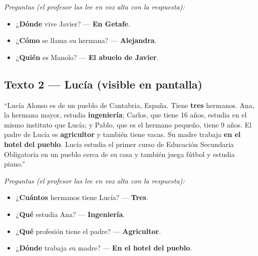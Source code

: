 \documentclass[a4paper,10pt]{article}
\begin{document}
\vspace{0.2cm}

\textit{Preguntas (el profesor las lee en voz alta con la respuesta):}

\begin{itemize}[leftmargin=1.5cm, itemsep=2pt]
\item[\textcolor{verde}{$\bullet$}] ¿\textcolor{verde}{\textbf{Dónde}} vive Javier? --- \textcolor{verde}{\textbf{En Getafe}}.
\item[\textcolor{colornaranja}{$\bullet$}] ¿\textcolor{colornaranja}{\textbf{Cómo}} se llama su hermana? --- \textcolor{colornaranja}{\textbf{Alejandra}}.
\item[\textcolor{rojo}{$\bullet$}] ¿\textcolor{rojo}{\textbf{Quién}} es Manolo? --- \textcolor{rojo}{\textbf{El abuelo de Javier}}.
\end{itemize}

\vspace{0.3cm}

\subsection*{\textcolor{naranja}{Texto 2 --- Lucía} {\small (visible en pantalla)}}

{\small
``Lucía Alonso es de un pueblo de Cantabria, España. Tiene \textcolor{morado}{\textbf{tres}} hermanos. Ana, la hermana mayor, estudia \textcolor{azul}{\textbf{ingeniería}}; Carlos, que tiene 16 años, estudia en el mismo instituto que Lucía; y Pablo, que es el hermano pequeño, tiene 9 años. El padre de Lucía es \textcolor{azul}{\textbf{agricultor}} y también tiene vacas. Su madre trabaja \textcolor{verde}{\textbf{en el hotel del pueblo}}. Lucía estudia el primer curso de Educación Secundaria Obligatoria en un pueblo cerca de su casa y también juega fútbol y estudia piano.''}

\vspace{0.2cm}

\textit{Preguntas (el profesor las lee en voz alta con la respuesta):}

\begin{itemize}[leftmargin=1.5cm, itemsep=2pt]
\item[\textcolor{morado}{$\bullet$}] ¿\textcolor{morado}{\textbf{Cuántos}} hermanos tiene Lucía? --- \textcolor{morado}{\textbf{Tres}}.
\item[\textcolor{azul}{$\bullet$}] ¿\textcolor{azul}{\textbf{Qué}} estudia Ana? --- \textcolor{azul}{\textbf{Ingeniería}}.
\item[\textcolor{azul}{$\bullet$}] ¿\textcolor{azul}{\textbf{Qué}} profesión tiene el padre? --- \textcolor{azul}{\textbf{Agricultor}}.
\item[\textcolor{verde}{$\bullet$}] ¿\textcolor{verde}{\textbf{Dónde}} trabaja su madre? --- \textcolor{verde}{\textbf{En el hotel del pueblo}}.
\end{itemize}
\end{document}
